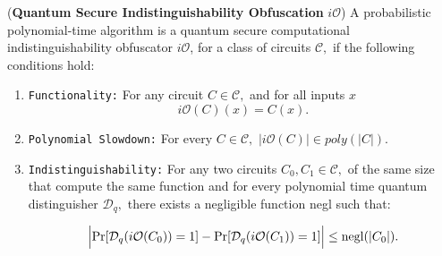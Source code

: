 %
%


\begin{definition}\label{def:qiO} {\rm({\bf Quantum Secure Indistinguishability Obfuscation} $i\mathcal{O}$)}
A probabilistic polynomial-time algorithm is a quantum secure computational indistinguishability obfuscator $i\mathcal{O}$, for a class of circuits ${\mathcal C},$ if the following conditions hold:

\begin{enumerate}
\item {\tt Functionality:} For any circuit $C\in {\mathcal C},$ and for all inputs $x$ $$i\mathcal{O}(C)(x)=C(x).$$
\item  {\tt Polynomial Slowdown:}  For every $C\in \mathcal{C},$  $|i\mathcal{O}(C)| \in poly(|C|).$
\item {\tt Indistinguishability:} For any two circuits $C_0,C_1\in {\mathcal C},$ of the same size  that compute the same function
 and for every polynomial time quantum distinguisher $\mathcal{D}_q,$  there exists a negligible function {\rm negl} such that:

					$$\Big | {\rm Pr}[\mathcal{D}_q(i\mathcal{O}(C_0))=1]-{\rm Pr}[\mathcal{D}_q(i\mathcal{O}(C_1))=1] \Big |\leq  {\rm negl}(|C_0|).$$			
\end{enumerate}										
\end{definition}



